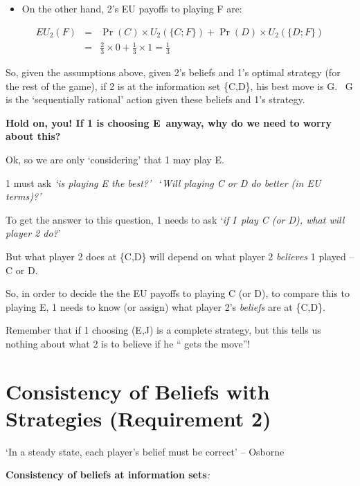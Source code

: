\documentclass{article}
\begin{document}
\begin{itemize}
\item On the other hand, 2's EU payoffs to playing F are:
\end{itemize}

\begin{eqnarray*}
EU_{2}(F) &=&\Pr (C)\times U_{2}(\{C;F\})+\Pr (D)\times U_{2}(\{D;F\}) \\
&=&\frac{2}{3}\times 0+\frac{1}{3}\times 1=\frac{1}{3}
\end{eqnarray*}

So, given the assumptions above, given 2's beliefs and 1's optimal strategy
(for the rest of the game), if 2 is at the information set \{C,D\}, his best
move is G. \ G is the `sequentially rational' action given these beliefs and
1's strategy.

\bigskip

\textbf{Hold on, you! If 1 is choosing E\ anyway, why do we need to worry
about this?}

Ok, so we are only `considering' that 1 may play E. \ 

1 must ask \textit{`is playing E the best?'} \ `\textit{Will playing C or D
do better (in EU terms)?'}

To get the answer to this question, 1 needs to ask `\textit{if I\ play C (or
D), what will player 2 do?}'

\bigskip

But what player 2 does at \{C,D\} will depend on what player 2 \textit{%
believes }1 played -- C or D.

So, in order to decide the the EU payoffs to playing C (or D), to compare
this to playing E, 1 needs to know (or assign) what player 2's \textit{%
beliefs }are at \{C,D\}.

{\footnotesize Remember that if 1 choosing (E,J) is a complete strategy, but
this tells us nothing about what 2 is to believe if he \textquotedblleft
gets the move\textquotedblright !}

\bigskip

\section{Consistency of Beliefs with Strategies (Requirement 2)}

`In a steady state, each player's belief must be correct' -- Osborne

\bigskip

\textbf{Consistency of beliefs at information sets}\textit{:}
\end{document}
